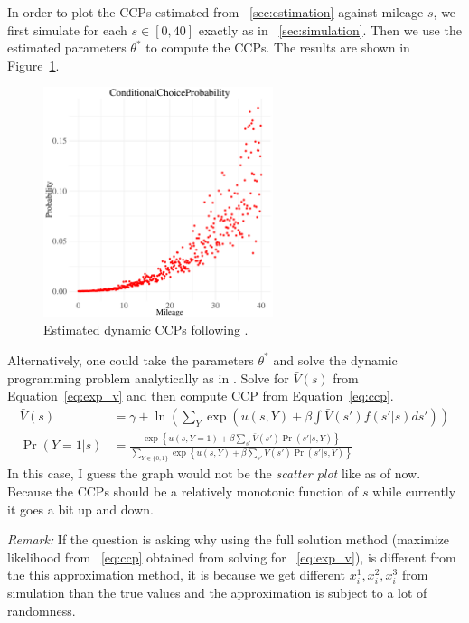 \documentclass[12pt]{article}[margin=1in]
\begin{document}
In order to plot the CCPs estimated from ~\ref{sec:estimation} against mileage
$s$, we first simulate for each $s\in [0,40]$ exactly as in
~\ref{sec:simulation}. Then we use the estimated parameters $\theta^*$ to
compute the CCPs. The results are shown in Figure~\ref{fig:ccp_dynamic}.
\begin{figure}[!htbp]
    \centering
    \includegraphics[width=0.6\textwidth]{../Figures/ccp_dynamic.pdf}
    \caption{Estimated dynamic CCPs following \citet{bajari2007estimating}.}
    \label{fig:ccp_dynamic}
\end{figure}
Alternatively, one could take the parameters $\theta^*$ and solve the dynamic
programming problem analytically as in \citet{rust1987optimal}. Solve for
$\bar{V}(s)$ from Equation~\ref{eq:exp_v} and then compute CCP from
Equation~\ref{eq:ccp}.
\begin{align}
    \bar{V}(s) & =\gamma+\ln\left(\sum_{Y} \exp\left(u(s,Y)+\beta\int \bar{V}(s') f(s'|s) ds'\right)\right)                                        \label{eq:exp_v}                                     \\
    \Pr(Y=1|s) & =\frac{\exp\left\{ u(s,Y=1) + \beta \sum_{s'}\bar{V}(s') \Pr(s'|s,Y)\right\}}{\sum_{Y \in \{0,1\}} \exp\left\{ u(s,Y) + \beta \sum_{s'}\bar{V}(s') \Pr(s'|s,Y)\right\}} \label{eq:ccp}
\end{align}
In this case, I guess the graph would not be the \textit{scatter plot} like as
of now. Because the CCPs should be a relatively monotonic function of $s$ while
currently it goes a bit up and down.

\textit{Remark:} If the question is asking why using the full solution method (maximize likelihood from ~\ref{eq:ccp} obtained from solving for ~\ref{eq:exp_v}), is different from the this approximation method, it is because we get different $x_{i}^1,x_{i}^2,x_{i}^3$ from simulation than the true values and the approximation is subject to a lot of randomness.
\end{document}
